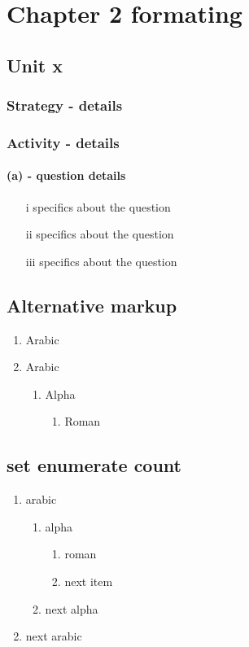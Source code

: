 \documentclass{report}
\begin{document}
\chapter{Chapter 2 formating}
\section{Unit x}

\subsection{Strategy - details}

\subsection{Activity - details}

\subsubsection{(a) - question details}

\begin{itemize}
\item[i] specifics about the question
\item[ii] specifics about the question
\item[iii] specifics about the question
\end{itemize}
\clearpage

\section{Alternative markup}

\begin{enumerate}
	\item Arabic
	\item Arabic
	\begin{enumerate}
		\item Alpha
			\begin{enumerate}
				\item Roman
			\end{enumerate}
	\end{enumerate}
\end{enumerate}

\section{set enumerate count}
\begin{enumerate}[4]
	\item arabic
	\begin{enumerate}
		\item alpha
			\begin{enumerate}
				\item roman
				\item next item
			\end{enumerate}
		\item next alpha			
	\end{enumerate}
	\item next arabic
\end{enumerate}
\end{document}
